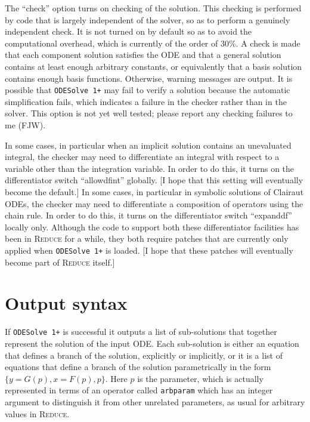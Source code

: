 \documentclass[a4paper]{article} %
\newcommand{\ODESolve}[1]{\texttt{ODESolve\,#1}}
\newcommand{\REDUCE}{\textsc{Reduce}}
\begin{document}
The ``check'' option turns on checking of the solution.  This checking
is performed by code that is largely independent of the solver, so as
to perform a genuinely independent check.  It is not turned on by
default so as to avoid the computational overhead, which is currently
of the order of 30\%.  A check is made that each component solution
satisfies the ODE and that a general solution contains at least enough
arbitrary constants, or equivalently that a basis solution contains
enough basis functions.  Otherwise, warning messages are output.  It
is possible that \ODESolve{1+} may fail to verify a solution because
the automatic simplification fails, which indicates a failure in the
checker rather than in the solver.  This option is not yet well
tested; please report any checking failures to me (FJW).

In some cases, in particular when an implicit solution contains an
unevaluated integral, the checker may need to differentiate an
integral with respect to a variable other than the integration
variable.  In order to do this, it turns on the differentiator switch
``allowdfint'' globally.  [I hope that this setting will eventually
become the default.]  In some cases, in particular in symbolic
solutions of Clairaut ODEs, the checker may need to differentiate a
composition of operators using the chain rule.  In order to do this,
it turns on the differentiator switch ``expanddf'' locally only.
Although the code to support both these differentiator facilities has
been in \REDUCE{} for a while, they both require patches that are
currently only applied when \ODESolve{1+} is loaded.  [I hope that
these patches will eventually become part of \REDUCE{} itself.]


\section{Output syntax}

If \ODESolve{1+} is successful it outputs a list of sub-solutions that
together represent the solution of the input ODE\@.  Each sub-solution
is either an equation that defines a branch of the solution,
explicitly or implicitly, or it is a list of equations that define a
branch of the solution parametrically in the form $\{y = G(p), x =
F(p), p\}$.  Here $p$ is the parameter, which is actually represented
in terms of an operator called \texttt{arbparam} which has an integer
argument to distinguish it from other unrelated parameters, as usual
for arbitrary values in \REDUCE{}.
\end{document}
